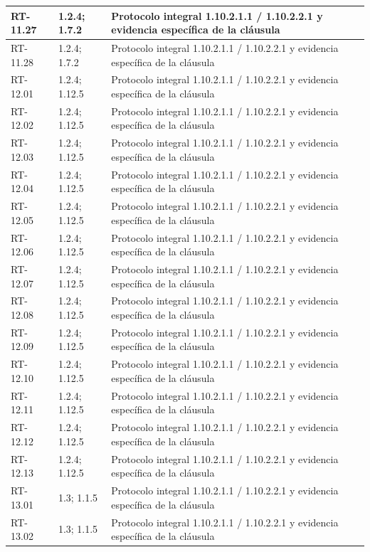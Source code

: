 \begin{longtable}{L{23mm}L{46mm}L{72mm}}
RT-11.27 & 1.2.4; 1.7.2 & Protocolo integral 1.10.2.1.1 / 1.10.2.2.1 y evidencia específica de la cláusula\\\hline
RT-11.28 & 1.2.4; 1.7.2 & Protocolo integral 1.10.2.1.1 / 1.10.2.2.1 y evidencia específica de la cláusula\\\hline
RT-12.01 & 1.2.4; 1.12.5 & Protocolo integral 1.10.2.1.1 / 1.10.2.2.1 y evidencia específica de la cláusula\\\hline
RT-12.02 & 1.2.4; 1.12.5 & Protocolo integral 1.10.2.1.1 / 1.10.2.2.1 y evidencia específica de la cláusula\\\hline
RT-12.03 & 1.2.4; 1.12.5 & Protocolo integral 1.10.2.1.1 / 1.10.2.2.1 y evidencia específica de la cláusula\\\hline
RT-12.04 & 1.2.4; 1.12.5 & Protocolo integral 1.10.2.1.1 / 1.10.2.2.1 y evidencia específica de la cláusula\\\hline
RT-12.05 & 1.2.4; 1.12.5 & Protocolo integral 1.10.2.1.1 / 1.10.2.2.1 y evidencia específica de la cláusula\\\hline
RT-12.06 & 1.2.4; 1.12.5 & Protocolo integral 1.10.2.1.1 / 1.10.2.2.1 y evidencia específica de la cláusula\\\hline
RT-12.07 & 1.2.4; 1.12.5 & Protocolo integral 1.10.2.1.1 / 1.10.2.2.1 y evidencia específica de la cláusula\\\hline
RT-12.08 & 1.2.4; 1.12.5 & Protocolo integral 1.10.2.1.1 / 1.10.2.2.1 y evidencia específica de la cláusula\\\hline
RT-12.09 & 1.2.4; 1.12.5 & Protocolo integral 1.10.2.1.1 / 1.10.2.2.1 y evidencia específica de la cláusula\\\hline
RT-12.10 & 1.2.4; 1.12.5 & Protocolo integral 1.10.2.1.1 / 1.10.2.2.1 y evidencia específica de la cláusula\\\hline
RT-12.11 & 1.2.4; 1.12.5 & Protocolo integral 1.10.2.1.1 / 1.10.2.2.1 y evidencia específica de la cláusula\\\hline
RT-12.12 & 1.2.4; 1.12.5 & Protocolo integral 1.10.2.1.1 / 1.10.2.2.1 y evidencia específica de la cláusula\\\hline
RT-12.13 & 1.2.4; 1.12.5 & Protocolo integral 1.10.2.1.1 / 1.10.2.2.1 y evidencia específica de la cláusula\\\hline
RT-13.01 & 1.3; 1.1.5 & Protocolo integral 1.10.2.1.1 / 1.10.2.2.1 y evidencia específica de la cláusula\\\hline
RT-13.02 & 1.3; 1.1.5 & Protocolo integral 1.10.2.1.1 / 1.10.2.2.1 y evidencia específica de la cláusula\\\hline

\end{longtable}
